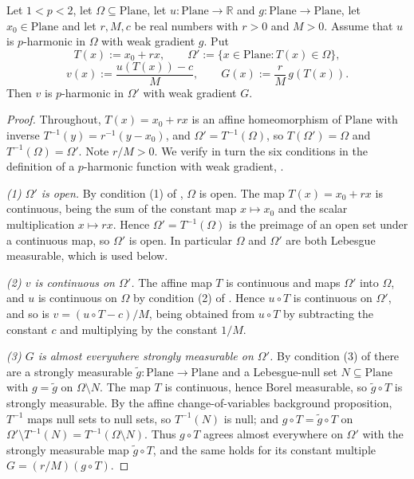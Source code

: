 \begin{lemma}
Let $1<p<2$, let $\Omega\subseteq\mathrm{Plane}$, let $u\colon\mathrm{Plane}\to\mathbb{R}$ and
$g\colon\mathrm{Plane}\to\mathrm{Plane}$, let $x_0\in\mathrm{Plane}$ and let $r,M,c$ be real
numbers with $r>0$ and $M>0$.  Assume that $u$ is $p$-harmonic in $\Omega$ with weak gradient
$g$.  Put
\[
  T(x):=x_0+rx,\qquad
  \Omega':=\{x\in\mathrm{Plane}:T(x)\in\Omega\},
\]
\[
  v(x):=\frac{u(T(x))-c}{M},\qquad
  G(x):=\frac rM\,g(T(x)).
\]
Then $v$ is $p$-harmonic in $\Omega'$ with weak gradient $G$.
\end{lemma}
\begin{proof}
Throughout, $T(x)=x_0+rx$ is an affine homeomorphism of $\mathrm{Plane}$ with inverse
$T^{-1}(y)=r^{-1}(y-x_0)$, and $\Omega'=T^{-1}(\Omega)$, so $T(\Omega')=\Omega$ and
$T^{-1}(\Omega)=\Omega'$.  Note $r/M>0$.  We verify in turn the six conditions in the
definition of a $p$-harmonic function with weak gradient, .

\medskip\noindent\emph{(1) $\Omega'$ is open.}
By condition (1) of , $\Omega$ is open.  The map $T(x)=x_0+rx$ is continuous,
being the sum of the constant map $x\mapsto x_0$ and the scalar multiplication $x\mapsto rx$.
Hence $\Omega'=T^{-1}(\Omega)$ is the preimage of an open set under a continuous map, so
$\Omega'$ is open.  In particular $\Omega$ and $\Omega'$ are both Lebesgue measurable, which
is used below.

\medskip\noindent\emph{(2) $v$ is continuous on $\Omega'$.}
The affine map $T$ is continuous and maps $\Omega'$ into $\Omega$, and $u$ is continuous on
$\Omega$ by condition (2) of .  Hence $u\circ T$ is continuous on $\Omega'$,
and so is $v=(u\circ T-c)/M$, being obtained from $u\circ T$ by subtracting the constant $c$
and multiplying by the constant $1/M$.

\medskip\noindent\emph{(3) $G$ is almost everywhere strongly measurable on $\Omega'$.}
By condition (3) of  there are a strongly measurable
$\tilde g\colon\mathrm{Plane}\to\mathrm{Plane}$ and a Lebesgue-null set
$N\subseteq\mathrm{Plane}$ with $g=\tilde g$ on $\Omega\setminus N$.  The map $T$ is
continuous, hence Borel measurable, so $\tilde g\circ T$ is strongly measurable.  By the
affine change-of-variables background proposition, $T^{-1}$ maps null sets to null sets, so
$T^{-1}(N)$ is null; and $g\circ T=\tilde g\circ T$ on
$\Omega'\setminus T^{-1}(N)=T^{-1}(\Omega\setminus N)$.  Thus $g\circ T$ agrees almost
everywhere on $\Omega'$ with the strongly measurable map $\tilde g\circ T$, and the same holds
for its constant multiple $G=(r/M)(g\circ T)$.


\end{proof}
